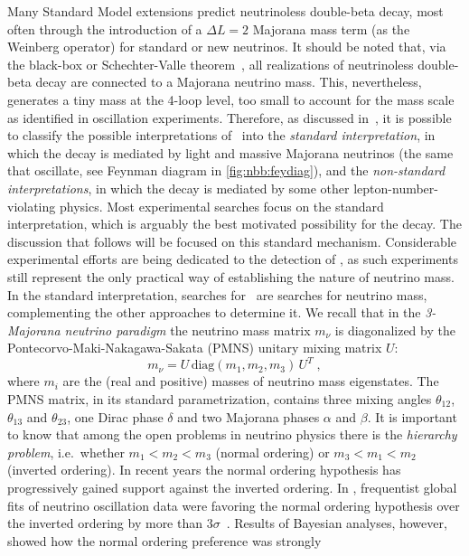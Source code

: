 \newpar
Many Standard Model extensions predict neutrinoless double-beta decay, most often through
the introduction of a $\Delta L = 2$ Majorana mass term (as the Weinberg operator) for
standard or new neutrinos.  It should be noted that, via the black-box or
Schechter-Valle theorem~\cite{Schechter1982}, all realizations of neutrinoless
double-beta decay are connected to a Majorana neutrino mass. This, nevertheless, generates a
tiny mass at the 4-loop level, too small to account for the mass scale as identified in
oscillation experiments.  Therefore, as discussed in~\cite{Rodejohann2011}, it is possible
to classify the possible interpretations of \onbb\ into the \emph{standard interpretation}, in
which the decay is mediated by light and massive Majorana neutrinos (the same that
oscillate, see Feynman diagram in \cref{fig:nbb:feydiag}), and the \emph{non-standard
interpretations}, in which the decay is mediated by some other lepton-number-violating
physics. Most experimental searches focus on the standard interpretation, which is
arguably the best motivated possibility for the decay. The discussion that follows will be
focused on this standard mechanism. Considerable experimental efforts are being dedicated
to the detection of \onbb, as such experiments still represent the only practical way of
establishing the nature of neutrino mass.
\newpar
In the standard interpretation, searches for \onbb\ are searches for neutrino mass,
complementing the other approaches to determine it. We recall that in the \emph{3-Majorana
neutrino paradigm} the neutrino mass matrix $m_\nu$ is diagonalized by the
Pontecorvo-Maki-Nakagawa-Sakata (PMNS) unitary mixing matrix $U$:
\[
  m_\nu = U \, \text{diag}(m_1, m_2, m_3) \, U^T \;,
\]
where $m_i$ are the (real and positive) masses of neutrino mass eigenstates.  The PMNS
matrix, in its standard parametrization, contains three mixing angles $\theta_{12}$,
$\theta_{13}$ and $\theta_{23}$, one Dirac phase $\delta$ and two Majorana phases
$\alpha$ and $\beta$. It is important to know that among the open problems in neutrino
physics there is the \emph{hierarchy problem}, i.e.~whether $m_1 < m_2 < m_3$ (normal ordering)
or $m_3 < m_1 < m_2$ (inverted ordering).  In recent years the normal ordering
hypothesis has progressively gained support against the inverted ordering. In ,
frequentist global fits of neutrino oscillation data were favoring the normal ordering
hypothesis over the inverted ordering by more than $3\sigma$~\cite{Esteban2019}. Results
of Bayesian analyses, however, showed how the normal ordering preference was strongly
